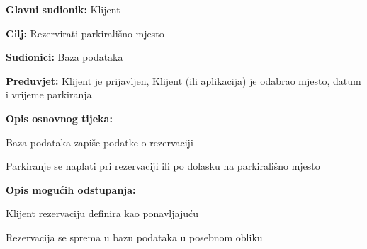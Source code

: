 					\noindent {}
					\begin{packed_item}
	
						\item \textbf{Glavni sudionik: }Klijent
						\item  \textbf{Cilj:} Rezervirati parkirališno mjesto
						\item  \textbf{Sudionici:} Baza podataka
						\item  \textbf{Preduvjet:} Klijent je prijavljen, Klijent (ili aplikacija) je odabrao mjesto, datum i vrijeme parkiranja
						\item  \textbf{Opis osnovnog tijeka:}
						
						\item[] \begin{packed_enum}
	
							\item Baza podataka zapiše podatke o rezervaciji
                            \item Parkiranje se naplati pri rezervaciji ili po dolasku na parkirališno mjesto
							
						\end{packed_enum}

						\item  \textbf{Opis mogućih odstupanja:}
						
						\item[] \begin{packed_item}
	
							\item[1.a] Klijent rezervaciju definira kao ponavljajuću
							\item[] \begin{packed_enum}
								
								\item Rezervacija se sprema u bazu podataka u posebnom obliku
								
								
							\end{packed_enum}
	
							
						\end{packed_item}	

					\end{packed_item}


